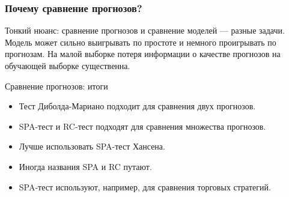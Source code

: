 \begin{frame}
    \frametitle{Почему сравнение прогнозов?}

    \alert{Тонкий нюанс}: сравнение прогнозов и сравнение моделей — разные задачи. 
    \pause
    Модель может сильно выигрывать \alert{по простоте} и немного проигрывать по прогнозам.
    \pause 
    На малой выборке \alert{потеря информации} о качестве прогнозов на обучающей выборке существенна. 
\end{frame}


\begin{frame}{Сравнение прогнозов: итоги}

  \begin{itemize}[<+->]
    \item Тест Диболда-Мариано подходит для сравнения \alert{двух} прогнозов. 
    \item SPA-тест и RC-тест подходят для сравнения \alert{множества} прогнозов. 
    \item Лучше использовать \alert{SPA-тест} Хансена. 
    \item Иногда названия \alert{SPA} и \alert{RC} путают. 
    \item SPA-тест используют, например, для сравнения \alert{торговых стратегий}. 
  \end{itemize}
\end{frame}

